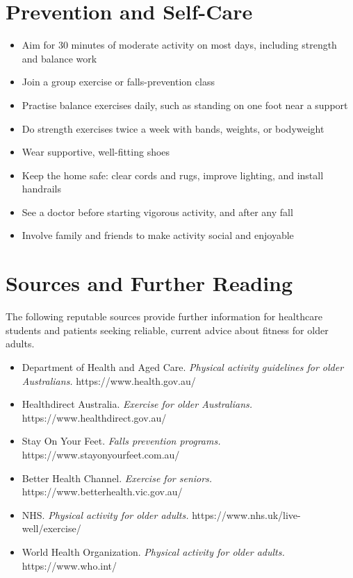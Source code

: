 \section*{Prevention and Self-Care}
\begin{itemize}
    \item Aim for 30 minutes of moderate activity on most days, including strength and balance work
    \item Join a group exercise or falls-prevention class
    \item Practise balance exercises daily, such as standing on one foot near a support
    \item Do strength exercises twice a week with bands, weights, or bodyweight
    \item Wear supportive, well-fitting shoes
    \item Keep the home safe: clear cords and rugs, improve lighting, and install handrails
    \item See a doctor before starting vigorous activity, and after any fall
    \item Involve family and friends to make activity social and enjoyable
\end{itemize}

\section*{Sources and Further Reading}
The following reputable sources provide further information for healthcare students and patients seeking reliable, current advice about fitness for older adults.
\begin{itemize}
    \item Department of Health and Aged Care. \textit{Physical activity guidelines for older Australians.} https://www.health.gov.au/
    \item Healthdirect Australia. \textit{Exercise for older Australians.} https://www.healthdirect.gov.au/
    \item Stay On Your Feet. \textit{Falls prevention programs.} https://www.stayonyourfeet.com.au/
    \item Better Health Channel. \textit{Exercise for seniors.} https://www.betterhealth.vic.gov.au/
    \item NHS. \textit{Physical activity for older adults.} https://www.nhs.uk/live-well/exercise/
    \item World Health Organization. \textit{Physical activity for older adults.} https://www.who.int/
\end{itemize}
